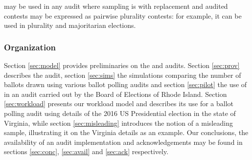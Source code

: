 \Providence may be used in any audit where sampling is with replacement and audited contests may be expressed as pairwise plurality contests: for example, it can be used in plurality and majoritarian elections. 


\subsubsection{Organization} 
Section \ref{sec:model} provides preliminaries on the \BRAVO and \Minerva audits. Section \ref{sec:prov} describes the \Providence audit, section \ref{sec:sims} the simulations comparing the number of ballots drawn using various ballot polling audits and section \ref{sec:pilot} the use of \Providence in an audit carried out by the Board of Elections of Rhode Island. Section \ref{sec:workload} presents our workload model and describes its use for a ballot polling audit using details of the 2016 US Presidential election in the state of Virginia, while section \ref{sec:misleading} introduces the notion of a misleading sample, illustrating it on the Virginia details as an example. Our conclusions, the availability of an audit implementation and acknowledgements may be found in sections \ref{sec:conc}, \ref{sec:avail} and \ref{sec:ack} respectively. 

